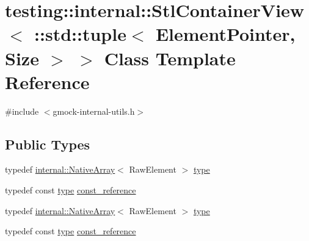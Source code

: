 \hypertarget{classtesting_1_1internal_1_1_stl_container_view_3_01_1_1std_1_1tuple_3_01_element_pointer_00_01_size_01_4_01_4}{}\section{testing\+::internal\+::Stl\+Container\+View$<$ \+::std\+::tuple$<$ Element\+Pointer, Size $>$ $>$ Class Template Reference}
\label{classtesting_1_1internal_1_1_stl_container_view_3_01_1_1std_1_1tuple_3_01_element_pointer_00_01_size_01_4_01_4}


{\ttfamily \#include $<$gmock-\/internal-\/utils.\+h$>$}

\subsection*{Public Types}
\begin{DoxyCompactItemize}
\item 
typedef \mbox{\hyperlink{classtesting_1_1internal_1_1_native_array}{internal\+::\+Native\+Array}}$<$ Raw\+Element $>$ \mbox{\hyperlink{classtesting_1_1internal_1_1_stl_container_view_3_01_1_1std_1_1tuple_3_01_element_pointer_00_01_size_01_4_01_4_aaa0289cd65ef99ea632d2fb0ad5480eb}{type}}
\item 
typedef const \mbox{\hyperlink{classtesting_1_1internal_1_1_stl_container_view_3_01_1_1std_1_1tuple_3_01_element_pointer_00_01_size_01_4_01_4_aaa0289cd65ef99ea632d2fb0ad5480eb}{type}} \mbox{\hyperlink{classtesting_1_1internal_1_1_stl_container_view_3_01_1_1std_1_1tuple_3_01_element_pointer_00_01_size_01_4_01_4_a0c2c9116c784cce6554d4aac9910482b}{const\+\_\+reference}}
\item 
typedef \mbox{\hyperlink{classtesting_1_1internal_1_1_native_array}{internal\+::\+Native\+Array}}$<$ Raw\+Element $>$ \mbox{\hyperlink{classtesting_1_1internal_1_1_stl_container_view_3_01_1_1std_1_1tuple_3_01_element_pointer_00_01_size_01_4_01_4_aaa0289cd65ef99ea632d2fb0ad5480eb}{type}}
\item 
typedef const \mbox{\hyperlink{classtesting_1_1internal_1_1_stl_container_view_3_01_1_1std_1_1tuple_3_01_element_pointer_00_01_size_01_4_01_4_aaa0289cd65ef99ea632d2fb0ad5480eb}{type}} \mbox{\hyperlink{classtesting_1_1internal_1_1_stl_container_view_3_01_1_1std_1_1tuple_3_01_element_pointer_00_01_size_01_4_01_4_a0c2c9116c784cce6554d4aac9910482b}{const\+\_\+reference}}
\end{DoxyCompactItemize}
